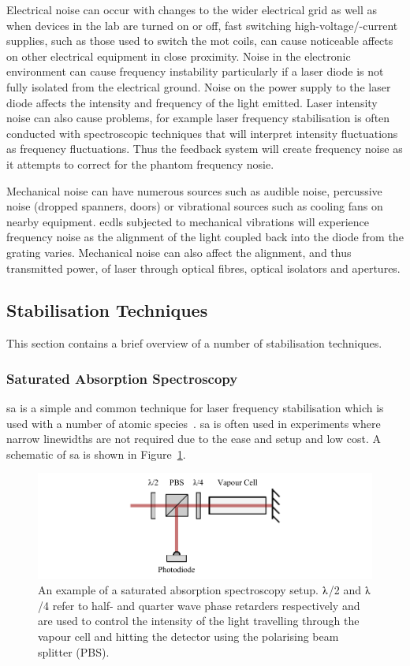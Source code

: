 Electrical noise can occur with changes to the wider electrical grid as well as when devices in the lab are turned on or off, fast switching high-voltage/-current supplies, such as those used to switch the \gls{mot} coils, can cause noticeable affects on other electrical equipment in close proximity.
Noise in the electronic environment can cause frequency instability particularly if a laser diode is not fully isolated from the electrical ground. Noise on the power supply to the laser diode affects the intensity and frequency of the light emitted.
Laser intensity noise can also cause problems, for example laser frequency stabilisation is often conducted with spectroscopic techniques that will interpret intensity fluctuations as frequency fluctuations. Thus the feedback system will create frequency noise as it attempts to correct for the phantom frequency nosie.

Mechanical noise can have numerous sources such as audible noise, percussive noise (dropped spanners, doors) or vibrational sources such as cooling fans on nearby equipment.
\Glspl{ecdl} subjected to mechanical vibrations will experience frequency noise as the alignment of the light coupled back into the diode from the grating varies.
Mechanical noise can also affect the alignment, and thus transmitted power, of laser through optical fibres, optical isolators and apertures.

\subsection{Stabilisation Techniques}

This section contains a brief overview of a number of stabilisation techniques.

\subsubsection{Saturated Absorption Spectroscopy}
\Gls{sa} is a simple and common technique for laser frequency stabilisation which is used with a number of atomic species~\cite{demtroder_laser_2003}.
\Gls{sa} is often used in experiments where narrow linewidths are not required due to the ease and setup and low cost.
A schematic of \gls{sa} is shown in Figure~\ref{figure:satabs}.

\begin{figure}
\center
\includegraphics{part1/Figs/SatAbs.pdf}
\caption{An example of a saturated absorption spectroscopy setup. $\lambdaup$/2 and $\lambdaup$/4 refer to half- and quarter wave phase retarders respectively and are used to control the intensity of the light travelling through the vapour cell and hitting the detector using the polarising beam splitter (PBS).}
\label{figure:satabs}
\end{figure}

